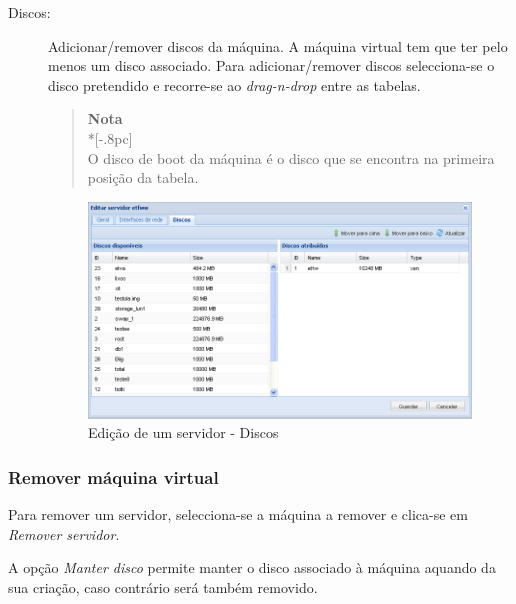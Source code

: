 \begin{description}
	\item[Discos:] Adicionar/remover discos da máquina. A máquina virtual tem que ter pelo menos um disco associado.
                    Para adicionar/remover discos selecciona-se o disco pretendido e recorre-se ao \emph{drag-n-drop} entre as tabelas.
                    
                \begin{quote}
                    {\large \bf Nota} \\*[-.8pc]
                    \underline{\hspace{6in}} \\
                    O disco de boot da máquina é o disco que se encontra na primeira posição da tabela.
                \end{quote}
                    
		\begin{figure}[H]
        		\begin{center}
		        \includegraphics[scale=0.5]{screenshots/server_edit_disks.png}
        		\caption{Edição de um servidor - Discos}
		        \label{fig:server_edit_disks}
	        	\end{center}
		\end{figure}

\end{description}



\subsubsection{Remover máquina virtual}
\label{sec:remove_server}
Para remover um servidor, selecciona-se a máquina a remover e clica-se em \emph{Remover servidor}.

A opção \emph{Manter disco} permite manter o disco associado à máquina aquando da sua criação, caso contrário será também removido.
		
